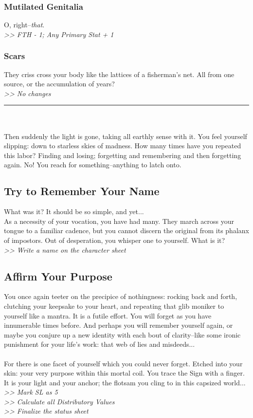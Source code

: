 \begin{multicols}{2}
\subsubsection*{Mutilated Genitalia}
O, right--\emph{that}.\\
\emph{>> FTH - 1; Any Primary Stat + 1}

\subsubsection*{Scars}
They criss cross your body like the lattices of a fisherman’s net. All from one source, or the accumulation of years?\\
\emph{>> No changes}\\
\end{multicols}
\hrule
\ \\
\ \\
Then suddenly the light is gone, taking all earthly sense with it. You feel yourself slipping: down to starless skies of madness. How many times have you repeated this labor? Finding and losing; forgetting and remembering and then forgetting again. No! You reach for something--anything to latch onto.

\subsection*{Try to Remember Your Name}
What was it? It should be so simple, and yet...\\

As a necessity of your vocation, you have had many. They march across your tongue to a familiar cadence, but you cannot discern the original from its phalanx of impostors. Out of desperation, you whisper one to yourself. What is it?\\
\emph{>> Write a name on the character sheet}

\pagebreak

\subsection*{Affirm Your Purpose}
You once again teeter on the precipice of nothingness: rocking back and forth, clutching your keepsake to your heart, and repeating that glib moniker to yourself like a mantra. It is a futile effort. You will forget as you have innumerable times before. And perhaps you will remember yourself again, or maybe you conjure up a new identity with each bout of clarity--like some ironic punishment for your life’s work: that web of lies and misdeeds...\\
\ \\
For there is one facet of yourself which you could never forget. Etched into your skin: your very purpose within this mortal coil. You trace the Sign with a finger. It is your light and your anchor; the flotsam you cling to in this capsized world...\\
\emph{>> Mark SL as 5\\
>> Calculate all Distributory Values\\
>> Finalize the status sheet}

